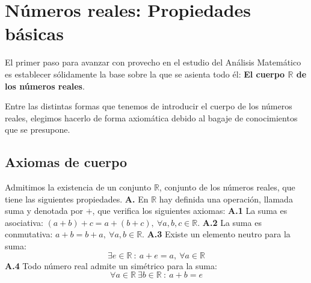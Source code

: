 \chapter{Números reales: Propiedades básicas}
    
El primer paso para avanzar con provecho en el estudio del Análisis Matemático es establecer
sólidamente la base sobre la que se asienta todo él: \textbf{El cuerpo $\mathbb{R}$ de los números reales}.

Entre las distintas formas que tenemos de introducir el cuerpo de los números reales, elegimos hacerlo
de forma axiomática debido al bagaje de conocimientos que se presupone.


\section{Axiomas de cuerpo}
Admitimos la existencia de un conjunto $\mathbb{R}$, conjunto de los números reales, que tiene las
siguientes propiedades.
\newline
\newline
\textbf{A.}\label{Axioma_A} En $\mathbb{R}$ hay definida una operación, llamada suma y denotada por $+$, que
verifica los siguientes axiomas:
\newline
\newline
\hspace*{1cm} \textbf{A.1} La suma es asociativa: $(a+b)+c=a+(b+c), ~\forall a,b,c \in \mathbb{R}$.
\newline
\hspace*{1cm} \textbf{A.2} La suma es conmutativa: $a+b=b+a, ~\forall a,b \in \mathbb{R}$.
\newline
\hspace*{1cm} \textbf{A.3} Existe un elemento neutro para la suma:
\begin{equation*}
    \exists e \in \mathbb{R} ~:~a+e=a,~ \forall a \in \mathbb{R}
\end{equation*}
\hspace*{1cm} \textbf{A.4} Todo número real admite un simétrico para la suma:
\begin{equation*}
    \forall a \in \mathbb{R}~ \exists b \in \mathbb{R} ~:~a+b=e
\end{equation*}

